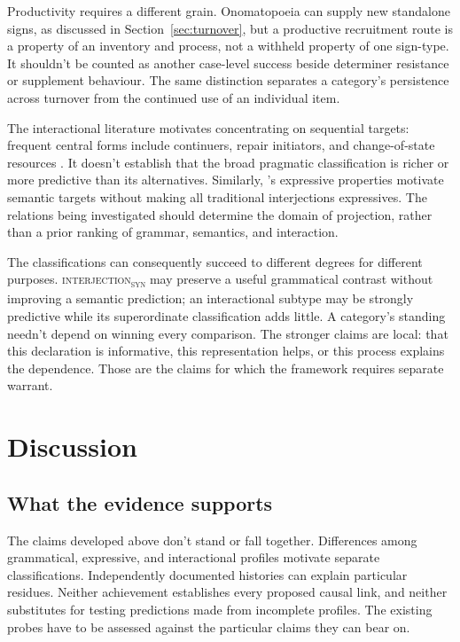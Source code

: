 \documentclass[12pt]{article}
\newcommand{\intj}[1]{\textsc{interjection\textsubscript{#1}}}
\begin{document}
Productivity requires a different grain. Onomatopoeia can supply new standalone signs, as discussed in Section~\ref{sec:turnover}, but a productive recruitment route is a property of an inventory and process, not a withheld property of one sign-type. It shouldn't be counted as another case-level success beside determiner resistance or supplement behaviour. The same distinction separates a category's persistence across turnover from the continued use of an individual item.

The interactional literature motivates concentrating on sequential targets: frequent central forms include continuers, repair initiators, and change-of-state resources \citep[257--259, 263]{dingemanse2024}. It doesn't establish that the broad pragmatic classification is richer or more predictive than its alternatives. Similarly, \textcite[166--167]{potts2007}'s expressive properties motivate semantic targets without making all traditional interjections expressives. The relations being investigated should determine the domain of projection, rather than a prior ranking of grammar, semantics, and interaction.

The classifications can consequently succeed to different degrees for different purposes. \intj{syn} may preserve a useful grammatical contrast without improving a semantic prediction; an interactional subtype may be strongly predictive while its superordinate classification adds little. A category's standing needn't depend on winning every comparison. The stronger claims are local: that this declaration is informative, this representation helps, or this process explains the dependence. Those are the claims for which the framework requires separate warrant.

\section{Discussion}\label{sec:discussion}

\subsection{What the evidence supports}

The claims developed above don't stand or fall together. Differences among grammatical, expressive, and interactional profiles motivate separate classifications. Independently documented histories can explain particular residues. Neither achievement establishes every proposed causal link, and neither substitutes for testing predictions made from incomplete profiles. The existing probes have to be assessed against the particular claims they can bear on.
\end{document}
